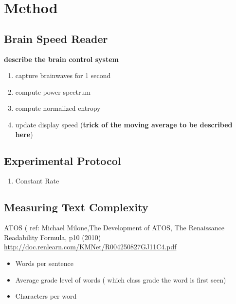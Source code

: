 \section{Method}

\subsection{Brain Speed Reader}

{\bf describe the brain control system}

\begin{enumerate}
  \item capture brainwaves for 1 second
  \item compute power spectrum
  \item compute normalized entropy
  \item update display speed ({\bf trick of the moving average to be described here})
\end{enumerate}


\subsection{Experimental Protocol}


\begin{enumerate}
  \item Constant Rate
\end{enumerate}


\subsection{Measuring Text Complexity}

ATOS  ( ref: Michael Milone,The Development of ATOS, The Renaissance Readability Formula, p10 (2010) \url{http://doc.renlearn.com/KMNet/R004250827GJ11C4.pdf}

\begin{itemize}
  \item Words per sentence
  \item Average grade level of words ( which class grade the word is first seen)
  \item Characters per word
\end{itemize}


